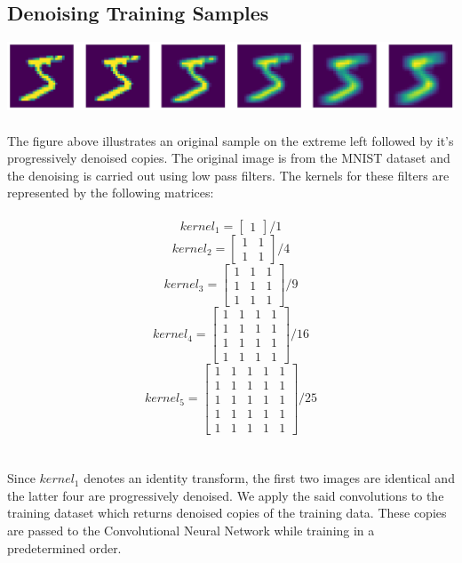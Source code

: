 \documentclass[12pt]{article}
\begin{document}
\begin{multicols}{2}
		\section{Denoising Training Samples}
		\includegraphics[width=\linewidth]{assets/denoise.png}
		\\\\
		The figure above illustrates an original sample on the extreme left followed by it's progressively denoised copies. The original image is from the MNIST dataset and the denoising is carried out using low pass filters. The kernels for these filters are represented by the following matrices:
		\\\\
		$$ kernel_{1} = \begin{bmatrix}
			1
		\end{bmatrix} / 1 $$
		$$ kernel_{2} = \begin{bmatrix}
			1 & 1 \\
			1 & 1
		\end{bmatrix} / 4$$
		$$ kernel_{3} = \begin{bmatrix}
			1 & 1 & 1 \\
			1 & 1 & 1 \\
			1 & 1 & 1
		\end{bmatrix} / 9$$
		$$ kernel_{4} = \begin{bmatrix}
			1 & 1 & 1 & 1 \\
			1 & 1 & 1 & 1 \\
			1 & 1 & 1 & 1 \\
			1 & 1 & 1 & 1
		\end{bmatrix} / 16$$
		$$ kernel_{5} = \begin{bmatrix}
			1 & 1 & 1 & 1 & 1 \\
			1 & 1 & 1 & 1 & 1 \\
			1 & 1 & 1 & 1 & 1 \\
			1 & 1 & 1 & 1 & 1 \\
			1 & 1 & 1 & 1 & 1
		\end{bmatrix} / 25$$
		\\\\
		Since $kernel_{1}$ denotes an identity transform, the first two images are identical and the latter four are progressively denoised. We apply the said convolutions to the training dataset which returns denoised copies of the training data. These copies are passed to the Convolutional Neural Network while training in a predetermined order.
		

\end{multicols}
\end{document}

